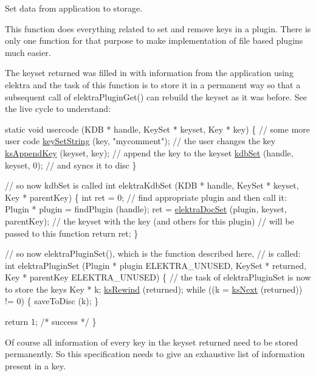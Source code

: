 Set data from application to storage. 

This function does everything related to set and remove keys in a plugin. There is only one function for that purpose to make implementation of file based plugins much easier.

The keyset {\ttfamily returned} was filled in with information from the application using elektra and the task of this function is to store it in a permanent way so that a subsequent call of elektra\+Plugin\+Get() can rebuild the keyset as it was before. See the live cycle to understand\+:


\begin{DoxyCodeInclude}
\textcolor{keyword}{static} \textcolor{keywordtype}{void} usercode (KDB * handle, KeySet * keyset, Key * key)
\{
        \textcolor{comment}{// some more user code}
        \hyperlink{group__keyvalue_ga622bde1eb0e0c4994728331326340ef2}{keySetString} (key, \textcolor{stringliteral}{"mycomment"}); \textcolor{comment}{// the user changes the key}
        \hyperlink{group__keyset_gaa5a1d467a4d71041edce68ea7748ce45}{ksAppendKey} (keyset, key);       \textcolor{comment}{// append the key to the keyset}
        \hyperlink{group__kdb_ga11436b058408f83d303ca5e996832bcf}{kdbSet} (handle, keyset, 0);      \textcolor{comment}{// and syncs it to disc}
\}

\textcolor{comment}{// so now kdbSet is called}
\textcolor{keywordtype}{int} elektraKdbSet (KDB * handle, KeySet * keyset, Key * parentKey)
\{
        \textcolor{keywordtype}{int} ret = 0;
        \textcolor{comment}{// find appropriate plugin and then call it:}
        Plugin * plugin = findPlugin (handle);
        ret = \hyperlink{group__plugin_gae65781a1deb34efc79c8cb9d9174842c}{elektraDocSet} (plugin, keyset, parentKey);
        \textcolor{comment}{// the keyset with the key (and others for this plugin)}
        \textcolor{comment}{// will be passed to this function}
        \textcolor{keywordflow}{return} ret;
\}

\textcolor{comment}{// so now elektraPluginSet(), which is the function described here,}
\textcolor{comment}{// is called:}
\textcolor{keywordtype}{int} elektraPluginSet (Plugin * plugin ELEKTRA\_UNUSED, KeySet * returned, Key * parentKey ELEKTRA\_UNUSED)
\{
        \textcolor{comment}{// the task of elektraPluginSet is now to store the keys}
        Key * k;
        \hyperlink{group__keyset_gabe793ff51f1728e3429c84a8a9086b70}{ksRewind} (returned);
        \textcolor{keywordflow}{while} ((k = \hyperlink{group__keyset_ga317321c9065b5a4b3e33fe1c399bcec9}{ksNext} (returned)) != 0)
        \{
                saveToDisc (k);
        \}

        \textcolor{keywordflow}{return} 1; \textcolor{comment}{/* success */}
\}
\end{DoxyCodeInclude}
 Of course all information of every key in the keyset {\ttfamily returned} need to be stored permanently. So this specification needs to give an exhaustive list of information present in a key.

